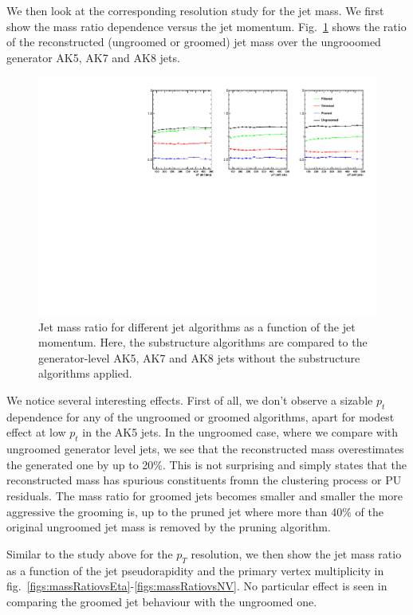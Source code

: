We then look at the corresponding resolution study for the jet mass. We first show the mass ratio dependence versus the jet momentum. Fig.~\ref{figs:massRatio} shows the ratio of the reconstructed  (ungroomed or groomed) jet mass over the ungrooomed generator  AK5, AK7 and AK8 jets. 

\begin{figure}[!htb]
\centering
\includegraphics[width=1.0\textwidth]{figs/massRatioOvGen_vsPt.pdf}
\caption{Jet mass ratio for different jet algorithms as a function of the jet momentum. Here, the  substructure algorithms are compared to the
  generator-level AK5, AK7 and AK8 jets without the substructure algorithms applied.}
\label{figs:massRatio}
\end{figure}

We notice several interesting effects. First of all, we don't observe a sizable $p_t$ dependence for any of the ungroomed or groomed algorithms, apart for modest effect at low $p_t$  in the AK5 jets. In the ungroomed case, where we compare with ungroomed generator level jets, we see that the reconstructed mass overestimates the generated one by up to 20\%. This is not surprising and simply states that the reconstructed  mass has spurious constituents fromn the clustering process or PU residuals. The mass ratio for groomed jets becomes smaller and smaller the more aggressive the grooming is, up to the pruned jet where more than 40\% of the original ungroomed jet mass is removed by the pruning algorithm.  

Similar to the study above for the $p_T$ resolution, we then show the jet mass ratio  as a function of the jet pseudorapidity and the primary vertex multiplicity in fig.~\ref{figs:massRatiovsEta}-\ref{figs:massRatiovsNV}. No particular effect is seen in comparing the groomed jet behaviour with the ungroomed one.  


